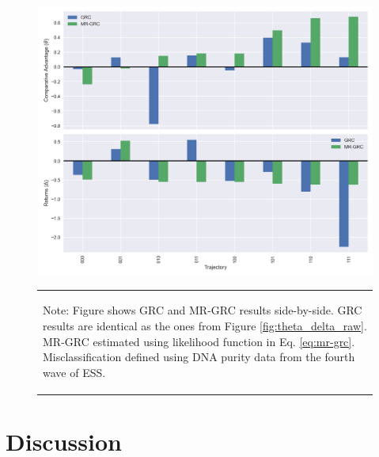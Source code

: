 \documentclass[11pt]{article}
\begin{document}
\begin{figure}
    \centering
    \includegraphics[scale=0.7]{results/figures/mr-theta.png}
    \caption{Comparative Advantage and Returns to Adoption: GRC and MR-GRC Results}
    \label{fig:mr-grc}
            \vspace*{-2em}
    \begin{table}[H]
        \centering
        \begin{tabular}{p{}} 
            \begin{tablenotes}
                  \small
                  \item Note: Figure shows GRC and MR-GRC results side-by-side. GRC results are identical as the ones from Figure \ref{fig:theta_delta_raw}. MR-GRC estimated using likelihood function in Eq. \ref{eq:mr-grc}. Misclassification defined using DNA purity data from the fourth wave of ESS. 
            \end{tablenotes}
        \end{tabular}
    \end{table}
\end{figure}


\section{Discussion}
\end{document}

